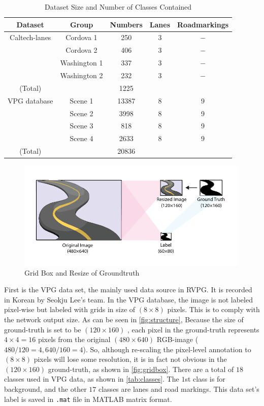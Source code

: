 \begin{spacing}{1.5}
\begin{table}[ht]
\centering
\caption{Dataset Size and Number of Classes Contained}
\label{tab:dataset}
\begin{tabular}{@{}ccccc@{}}
\toprule
Dataset & Group & Numbers & Lanes & Roadmarkings \\ \midrule
Caltech-lanes & Cordova 1 & 250 & 3 & $-$ \\
 & Cordova 2 & 406 & 3 & $-$ \\
 & Washington 1 & 337 & 3 & $-$ \\
 & Washington 2 & 232 & 3 & $-$ \\
(Total) &  & 1225 &  &  \\
VPG database & Scene 1 & 13387 & 8 & 9 \\
 & Scene 2 & 3998 & 8 & 9 \\
 & Scene 3 & 818 & 8 & 9 \\
 & Scene 4 & 2633 & 8 & 9 \\
(Total) &  & 20836 &  &  \\ \bottomrule
\end{tabular}
\end{table}

\begin{figure}[ht]
\centering
\includegraphics[width=0.99\textwidth, fbox]{Chapter3/gridbox.pdf}
\caption{Grid Box and Resize of Groundtruth}
\label{fig:gridbox} 
\end{figure}

First is the VPG data set, the mainly used data source in RVPG. It is recorded in Korean by Seokju Lee's team. In the VPG database, the image is not labeled pixel-wise but labeled with grids in size of $(8 \times 8)$ pixels. This is to comply with the network output size. As can be seen in \autoref{fig:structure}, Because the size of ground-truth is set to be $(120 \times 160)$ , each pixel in the ground-truth represents $4 \times 4 = 16$ pixels from the original $(480 \times 640)$ RGB-image ($480/120 = 4, 640/160 =  4$). So, although re-scaling the pixel-level annotation to $(8\times 8)$ pixels will lose some resolution, it is in fact not obvious in the $(120 \times 160)$ ground-truth, as shown in \autoref{fig:gridbox}. There are a total of $18$ classes used in VPG data, as shown in \autoref{tab:classes}. The $1$st class is for background, and the other $17$ classes are lanes and road markings. This data set's label is saved in \texttt{.mat} file in MATLAB matrix format.



\end{spacing}

